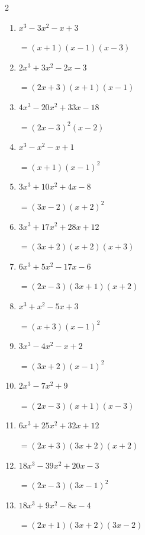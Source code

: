 \begin{multicols}{2}
\begin{enumerate}
  \item $x^{3}-3x^{2}-x+3$

        $=(x+1)(x-1)(x-3)$

  \item $2x^{3}+3x^{2}-2x-3$

        $=(2x+3)(x+1)(x-1)$

  \item $4x^{3}-20x^{2}+33x-18$

        $=(2x-3) ^{ 2 }(x-2)$

\columnbreak %

\resetques

  \item $x^{3}-x^{2}-x+1$

        $=(x+1)(x-1) ^{ 2 }$

  \item $3x^{3}+10x^{2}+4x-8$

        $=(3x-2)(x+2) ^{ 2 }$

  \item $3x^{3}+17x^{2}+28x+12$

        $=(3x+2)(x+2)(x+3)$

  \item $6x^{3}+5x^{2}-17x-6$

        $=(2x-3)(3x+1)(x+2)$

  \item $x^{3}+x^{2}-5x+3$

        $=(x+3)(x-1) ^{ 2 }$

\columnbreak %

  \item $3x^{3}-4x^{2}-x+2$

        $=(3x+2)(x-1) ^{ 2 }$

  \item $2x^{3}-7x^{2}+9$

        $=(2x-3)(x+1)(x-3)$

  \item $6x^{3}+25x^{2}+32x+12$

        $=(2x+3)(3x+2)(x+2)$

  \item $18x^{3}-39x^{2}+20x-3$

        $=(2x-3)(3x-1) ^{ 2 }$

  \item $18x^{3}+9x^{2}-8x-4$

        $=(2x+1)(3x+2)(3x-2)$

\columnbreak %

\resetques


\end{enumerate}
\end{multicols}

